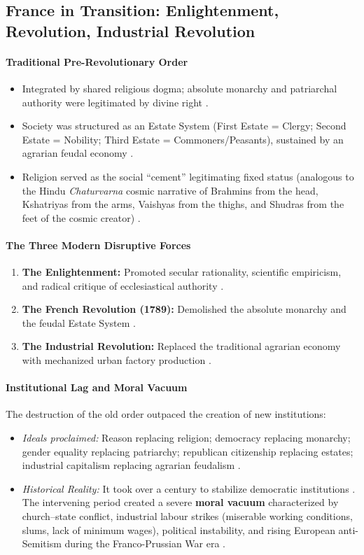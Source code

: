 \subsection{France in Transition: Enlightenment, Revolution, Industrial Revolution}

\paragraph{Traditional Pre-Revolutionary Order}
\begin{itemize}
    \item Integrated by shared religious dogma; absolute monarchy and patriarchal authority were legitimated by divine right .
    \item Society was structured as an Estate System (First Estate = Clergy; Second Estate = Nobility; Third Estate = Commoners/Peasants), sustained by an agrarian feudal economy .
    \item Religion served as the social ``cement'' legitimating fixed status (analogous to the Hindu \textit{Chaturvarna} cosmic narrative of Brahmins from the head, Kshatriyas from the arms, Vaishyas from the thighs, and Shudras from the feet of the cosmic creator) .
\end{itemize}

\paragraph{The Three Modern Disruptive Forces}
\begin{enumerate}
    \item \textbf{The Enlightenment:} Promoted secular rationality, scientific empiricism, and radical critique of ecclesiastical authority .
    \item \textbf{The French Revolution (1789):} Demolished the absolute monarchy and the feudal Estate System .
    \item \textbf{The Industrial Revolution:} Replaced the traditional agrarian economy with mechanized urban factory production .
\end{enumerate}

\paragraph{Institutional Lag and Moral Vacuum}
The destruction of the old order outpaced the creation of new institutions:
\begin{itemize}
    \item \textit{Ideals proclaimed:} Reason replacing religion; democracy replacing monarchy; gender equality replacing patriarchy; republican citizenship replacing estates; industrial capitalism replacing agrarian feudalism .
    \item \textit{Historical Reality:} It took over a century to stabilize democratic institutions . The intervening period created a severe \textbf{moral vacuum} characterized by church--state conflict, industrial labour strikes (miserable working conditions, slums, lack of minimum wages), political instability, and rising European anti-Semitism during the Franco-Prussian War era .
\end{itemize}

